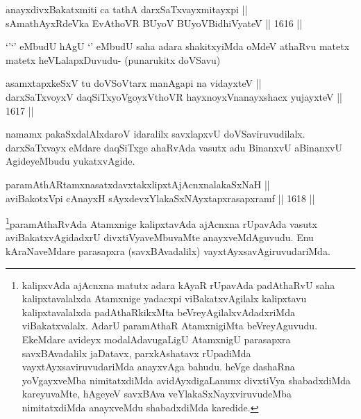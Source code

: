 \begin{shl}
anayxdivxBakatxmiti ca tathA darxSaTxvayxmitayxpi || \\
sAmathAyxRdeVka EvAthoVR BUyoV BUyoV\s BidhiVyateV ||  1616 ||  
\end{shl}

\begin{artha}
`\stext'`\stext' eMbudU hAgU `\stext' eMbudU saha adara shakitxyiMda oMdeV athaRvu matetx matetx heVLalapxDuvudu- (punarukitx doVSavu)
\end{artha}


\begin{shl}
asamxtapxkeSxV tu doVSoV\s tarx manAgapi na vidayxteV || \\
darxSaTxvoyxV daqSiTxyoVgoyxV\s thoVR hayxnoyxV\s nanayxshacx yujayxteV ||  1617 ||  
\end{shl}

\begin{artha}
namamx pakaSxdalAlxdaroV idaralilx savxlapxvU doVSaviruvudilalx. darxSaTxvayx eMdare daqSiTxge ahaRvAda vasutx adu BinanxvU aBinanxvU AgideyeMbudu yukatxvAgide.
\end{artha}


\begin{shl}
paramAthARtamxnasatxdavxtakxlipxtAjAcnxnalakaSxNaH ||  \\
aviBakotxV\s pi cAnayxH sAyxdevxYlakaSxNAyxtapxrasapxramf ||  1618 ||  
\end{shl}

\begin{artha}
\footnote{kalipxvAda ajAcnxna matutx adara kAyaR rUpavAda padAthaRvU saha kalipxtavalalxda Atamxnige yadacxpi viBakatxvAgilalx kalipxtavu kalipxtavalalxda padAthaRkikxMta beVreyAgilalxvAdadxriMda viBakatxvalalx. AdarU paramAthaR AtamxnigiMta beVreyAguvudu. EkeMdare avideyx modalAdavugaLigU AtamxnigU parasapxra savxBAvadalilx jaDatavx, parxkAshatavx rUpadiMda vayxtAyxsaviruvudariMda anayxvAga bahudu. heVge dashaRna yoVgayxveMba nimitatxdiMda avidAyxdigaLanunx divxtiVya shabadxdiMda kareyuvaMte, hAgeyeV savxBAva veYlakaSxNayxviruvudeMba nimitatxdiMda anayxveMdu shabadxdiMda karedide.}paramAthaRvAda Atamxnige kalipxtavAda ajAcnxna rUpavAda vasutx aviBakatxvAgidadxrU divxtiVyaveMbuvaMte anayxveMdAguvudu. Enu kAraNaveMdare parasapxra (savxBAvadalilx) vayxtAyxsavAgiruvudariMda.
\end{artha}

